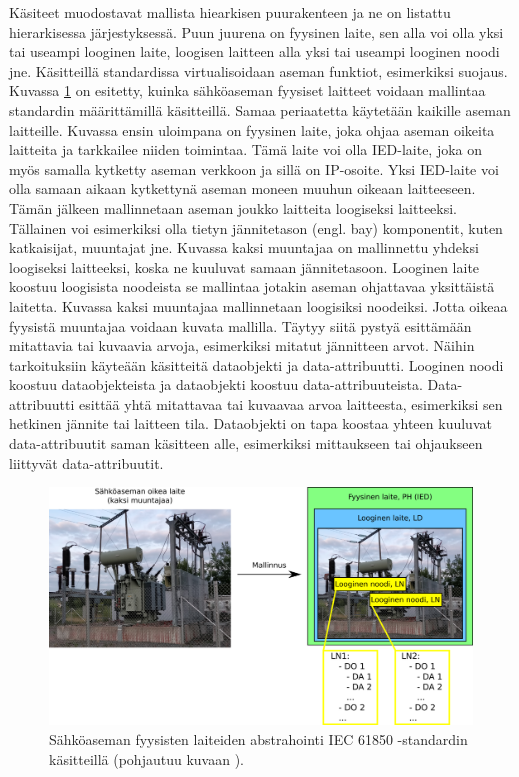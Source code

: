 Käsiteet muodostavat mallista hiearkisen puurakenteen ja ne on listattu hierarkisessa järjestyksessä. Puun juurena on fyysinen laite, sen alla voi olla yksi tai useampi looginen laite, loogisen laitteen alla yksi tai useampi looginen noodi jne. Käsitteillä standardissa virtualisoidaan aseman funktiot, esimerkiksi suojaus. Kuvassa \ref{fig:substation-abstraction} on esitetty, kuinka sähköaseman fyysiset laitteet voidaan mallintaa standardin määrittämillä käsitteillä. Samaa periaatetta käytetään kaikille aseman laitteille. Kuvassa ensin uloimpana on fyysinen laite, joka ohjaa aseman oikeita laitteita ja tarkkailee niiden toimintaa. Tämä laite voi olla IED-laite, joka on myös samalla kytketty aseman verkkoon ja sillä on IP-osoite. Yksi IED-laite voi olla samaan aikaan kytkettynä aseman moneen muuhun oikeaan laitteeseen. Tämän jälkeen mallinnetaan aseman joukko laitteita loogiseksi laitteeksi. Tällainen voi esimerkiksi olla tietyn jännitetason (engl. bay) komponentit, kuten katkaisijat, muuntajat jne. Kuvassa kaksi muuntajaa on mallinnettu yhdeksi loogiseksi laitteeksi, koska ne kuuluvat samaan jännitetasoon. Looginen laite koostuu loogisista noodeista se mallintaa jotakin aseman ohjattavaa yksittäistä laitetta. Kuvassa kaksi muuntajaa mallinnetaan loogisiksi noodeiksi. Jotta oikeaa fyysistä muuntajaa voidaan kuvata mallilla. Täytyy siitä pystyä esittämään mitattavia tai kuvaavia arvoja, esimerkiksi mitatut jännitteen arvot. Näihin tarkoituksiin käyteään käsitteitä dataobjekti ja data-attribuutti. Looginen noodi koostuu dataobjekteista ja dataobjekti koostuu data-attribuuteista. Data-attribuutti esittää yhtä mitattavaa tai kuvaavaa arvoa laitteesta, esimerkiksi sen hetkinen jännite tai laitteen tila. Dataobjekti on tapa koostaa yhteen kuuluvat data-attribuutit saman käsitteen alle, esimerkiksi mittaukseen tai ohjaukseen liittyvät data-attribuutit. \cite[s.~2]{Camachi2017} \cite[s.~24]{IEC61850-1}

\begin{figure}[ht!]
	\includegraphics[width=1\textwidth]{pictures/substation-abstraction.png}
	\caption{Sähköaseman fyysisten laiteiden abstrahointi IEC 61850 -standardin käsitteillä (pohjautuu kuvaan \cite[s.~17]{IEC61850-7-1}).}
	\label{fig:substation-abstraction}
\end{figure}

